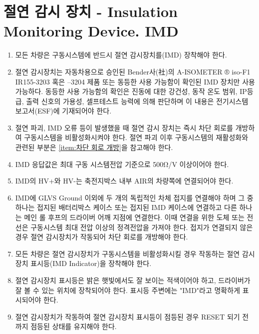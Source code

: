\documentclass[final,a4paper,10pt]{report}
\begin{document}
\section{절연 감시 장치 - Insulation Monitoring Device. IMD}
\begin{enumerate}
  \item 모든 차량은 구동시스템에 반드시 절연 감시장치를(IMD) 장착해야 한다.
  \item 절연 감시장치는 자동차용으로 승인된 Bender사({\hanja 社})의 A-ISOMETER ® iso-F1 IR155-3203 혹은 –3204 제품 또는 동등한 사용 가능함이 확인된 IMD 장치만 사용 가능하다. 동등한 사용 가능함의 확인은 진동에 대한 강건성, 동작 온도 범위, IP등급, 출력 신호의 가용성, 셀프테스트 능력에 의해 판단하며 이 내용은 전기시스템 보고서(ESF)에 기재되어야 한다.
  \item 절연 파괴, IMD 오류 등이 발생했을 때 절연 감시 장치는 즉시 차단 회로를 개방하여 구동시스템을 비활성화시켜야 한다. 절연 파괴 이후 구동시스템의 재활성화와 관련된 부분은 \cref{item:차단 회로 개방}을 참고해야 한다.
  \item IMD 응답값은 최대 구동 시스템전압 기준으로 500Ω/V 이상이어야 한다.
  \item IMD의 HV+와 HV-는 축전지박스 내부 AIR의 차량쪽에 연결되어야 한다.
  \item IMD에 GLVS Ground 이외에 두 개의 독립적인 차체 접지를 연결해야 하며 그 중 하나는 접지된 배터리박스 케이스 또는 접지된 IMD 케이스에 연결하고 다른 하나는 메인 롤 후프의 드라이버 어깨 지점에 연결한다. 이때 연결을 위한 도체 또는 전선은 구동시스템 최대 전압 이상의 정격전압을 가져야 한다. 접지가 연결되지 않은 경우 절연 감시장치가 작동되어 차단 회로를 개방해야 한다.
  \item 모든 차량은 절연 감시장치가 구동시스템을 비활성화시킬 경우 작동하는 절연 감시장치 표시등(IMD Indicator)을 장착해야 한다.
  \item 절연 감시장치 표시등은 밝은 햇빛에서도 잘 보이는 적색이어야 하고, 드라이버가 잘 볼 수 있는 위치에 장착되어야 한다. 표시등 주변에는 "IMD"라고 명확하게 표시되어야 한다.
  \item 절연 감시장치가 작동하여 절연 감시장치 표시등이 점등된 경우 RESET 되기 전까지 점등된 상태를 유지해야 한다.
\end{enumerate}
\end{document}
